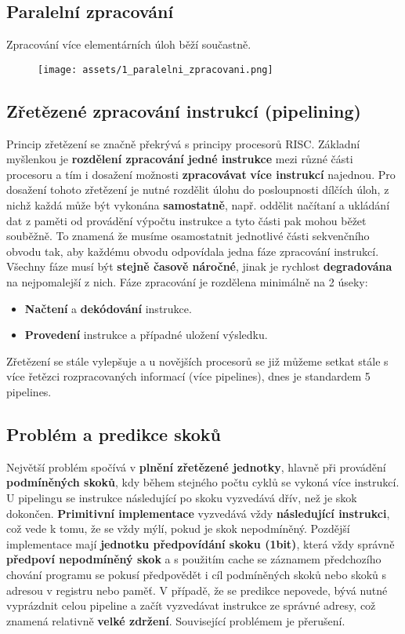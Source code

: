 \subsection{Paralelní zpracování}
Zpracování více elementárních úloh běží součastně.
\begin{figure}[H]
    \centering
    \texttt{[image: assets/1\_paralelni\_zpracovani.png]}
\end{figure}

\subsection{Zřetězené zpracování instrukcí (pipelining)}
Princip zřetězení se značně překrývá s principy procesorů RISC.
Základní myšlenkou je \textbf{rozdělení zpracování jedné instrukce} mezi různé části procesoru a tím i dosažení možnosti \textbf{zpracovávat} \textbf{více instrukcí }najednou. Pro dosažení tohoto zřetězení je nutné rozdělit úlohu do posloupnosti dílčích úloh, z nichž každá může být vykonána \textbf{samostatně}, např. oddělit načítaní a ukládání dat z paměti od provádění výpočtu instrukce a tyto části pak mohou běžet souběžně. To znamená že musíme osamostatnit jednotlivé části sekvenčního obvodu tak, aby každému obvodu odpovídala jedna fáze zpracování instrukcí. Všechny fáze musí být \textbf{stejně časově náročné}, jinak je rychlost \textbf{degradována} na nejpomalejší z nich. Fáze zpracování je rozdělena minimálně na 2 úseky:
\begin{itemize}
    \item \textbf{Načtení} a \textbf{dekódování} instrukce.
    \item \textbf{Provedení} instrukce a případné uložení výsledku.
\end{itemize}
Zřetězení se stále vylepšuje a u novějších procesorů se již můžeme setkat stále s více řetězci rozpracovaných informací (více pipelines), dnes je standardem 5 pipelines.

\subsection{Problém a predikce skoků}
Největší problém spočívá v \textbf{plnění zřetězené jednotky}, hlavně při provádění \textbf{podmíněných skoků}, kdy během stejného počtu cyklů se vykoná více instrukcí. U pipelingu se instrukce následující po skoku vyzvedává dřív, než je skok dokončen. \textbf{Primitivní implementace} vyzvedává vždy \textbf{následující instrukci}, což vede k tomu, že se vždy mýlí, pokud je skok nepodmíněný. Pozdější implementace mají \textbf{jednotku předpovídání skoku (1bit)}, která vždy správně \textbf{předpoví nepodmíněný skok} a s použitím cache se záznamem předchozího chování programu se pokusí předpovědět i cíl podmíněných skoků nebo skoků s adresou v registru nebo paměť. V případě, že se predikce nepovede, bývá nutné vyprázdnit celou pipeline a začít vyzvedávat instrukce ze správné adresy, což znamená relativně \textbf{velké zdržení}. Související problémem je přerušení.

